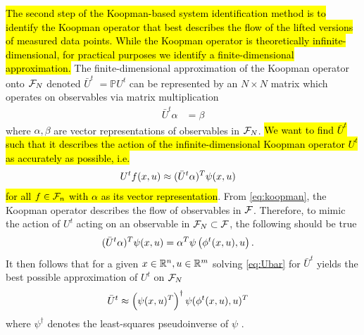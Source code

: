 \hl{
The second step of the Koopman-based system identification method is to identify the Koopman operator that best describes the flow of the lifted versions of measured data points.
While the Koopman operator is theoretically infinite-dimensional, for practical purposes we identify a finite-dimensional approximation.
}
The finite-dimensional approximation of the Koopman operator onto $\mathcal{F}_N$ denoted $\bar{U}^t$ \sout{$= \mathbb{P} U^t$}  can be represented by an $N \times N$ matrix which operates on observables via matrix multiplication
\begin{align}
    \bar{U}^t {\alpha} &= {\beta} 
    \label{eq:Ubar}
\end{align}
where $\alpha, \beta$ are vector representations of observables in $\mathcal{F}_N$.
\hl{We want to find $\bar{U}^t$ such that it describes the action of the infinite-dimensional Koopman operator $U^t$ as accurately as possible, i.e.}
\begin{align}
    U^t f(x,u) &\approx ( \bar{U}^t {\alpha} )^T {\psi}(x, u)
\end{align}
\hl{for all $f \in \mathcal{F}_n$ with $\alpha$ as its vector representation}.
From \eqref{eq:koopman}, the Koopman operator describes the flow of observables in $\mathcal{F}$.
Therefore, to mimic the action of $U^t$ acting on an observable in $\mathcal{F}_N \subset \mathcal{F}$, the following should be true
\begin{align}
    ( \bar{U}^t {\alpha} )^T {\psi}(x, u) &=
    {\alpha}^T {\psi} \left( \phi^t(x,u), u \right).
    \label{eq:Ubar}
\end{align}
It then follows that for a given ${x \in \mathbb{R}^n, u \in \mathbb{R}^m}$ solving \eqref{eq:Ubar} for $\bar{U}^t$ yields the best possible approximation of $U^t$ on $\mathcal{F}_N$
\begin{align}
    \bar{U}^t &\approx \left( {\psi}(x, u)^T \right)^\dagger {\psi}( \phi^t(x,u), u )^T
    \label{eq:Uapprox}
\end{align}
where ${\psi}^\dagger$ denotes the least-squares pseudoinverse of ${\psi}$ .

